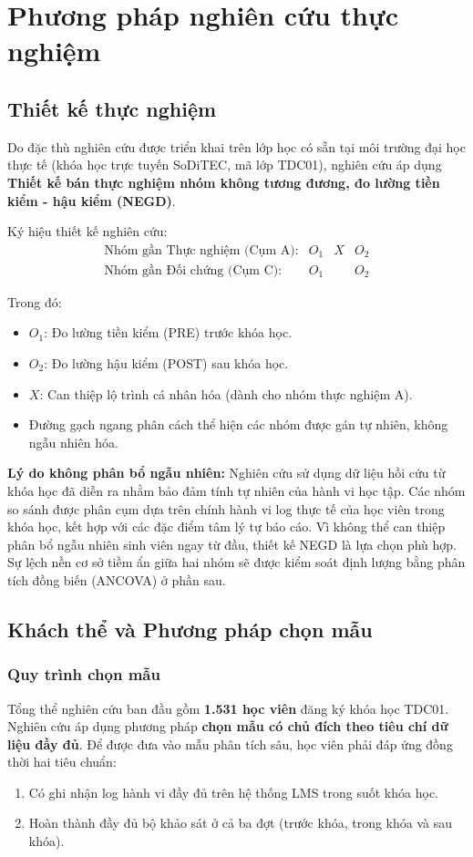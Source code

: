\section{Phương pháp nghiên cứu thực nghiệm}

\subsection{Thiết kế thực nghiệm}

Do đặc thù nghiên cứu được triển khai trên lớp học có sẵn tại môi trường đại học thực tế (khóa học trực tuyến SoDiTEC, mã lớp TDC01), nghiên cứu áp dụng \textbf{Thiết kế bán thực nghiệm nhóm không tương đương, đo lường tiền kiểm - hậu kiểm (NEGD)}.

Ký hiệu thiết kế nghiên cứu:
\[
\begin{array}{cccc}
\text{Nhóm gần Thực nghiệm (Cụm A):} & O_1 & X & O_2 \\
\hline
\text{Nhóm gần Đối chứng (Cụm C):} & O_1 &   & O_2
\end{array}
\]

Trong đó:
\begin{itemize}
    \item $O_1$: Đo lường tiền kiểm (PRE) trước khóa học.
    \item $O_2$: Đo lường hậu kiểm (POST) sau khóa học.
    \item $X$: Can thiệp lộ trình cá nhân hóa (dành cho nhóm thực nghiệm A).
    \item Đường gạch ngang phân cách thể hiện các nhóm được gán tự nhiên, không ngẫu nhiên hóa.
\end{itemize}

\textbf{Lý do không phân bổ ngẫu nhiên:} Nghiên cứu sử dụng dữ liệu hồi cứu từ khóa học đã diễn ra nhằm bảo đảm tính tự nhiên của hành vi học tập. Các nhóm so sánh được phân cụm dựa trên chính hành vi log thực tế của học viên trong khóa học, kết hợp với các đặc điểm tâm lý tự báo cáo. Vì không thể can thiệp phân bổ ngẫu nhiên sinh viên ngay từ đầu, thiết kế NEGD là lựa chọn phù hợp. Sự lệch nền cơ sở tiềm ẩn giữa hai nhóm sẽ được kiểm soát định lượng bằng phân tích đồng biến (ANCOVA) ở phần sau.

\subsection{Khách thể và Phương pháp chọn mẫu}

\subsubsection{Quy trình chọn mẫu}
Tổng thể nghiên cứu ban đầu gồm \textbf{1.531 học viên} đăng ký khóa học TDC01. Nghiên cứu áp dụng phương pháp \textbf{chọn mẫu có chủ đích theo tiêu chí dữ liệu đầy đủ}. Để được đưa vào mẫu phân tích sâu, học viên phải đáp ứng đồng thời hai tiêu chuẩn:
\begin{enumerate}
    \item Có ghi nhận log hành vi đầy đủ trên hệ thống LMS trong suốt khóa học.
    \item Hoàn thành đầy đủ bộ khảo sát ở cả ba đợt (trước khóa, trong khóa và sau khóa).
\end{enumerate}

